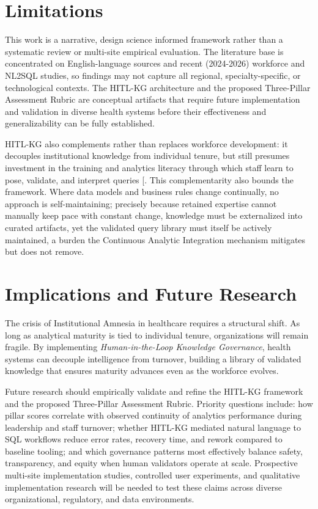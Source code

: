 \documentclass[
  american,
  11pt,
  letterpaper,
  oneside  ,captions=tableheading
]{scrartcl}
\begin{document}
\section{Limitations}\label{limitations}

This work is a narrative, design science informed framework rather than
a systematic review or multi-site empirical evaluation. The literature
base is concentrated on English-language sources and recent (2024-2026)
workforce and NL2SQL studies, so findings may not capture all regional,
specialty-specific, or technological contexts. The HITL-KG architecture
and the proposed Three-Pillar Assessment Rubric are conceptual artifacts
that require future implementation and validation in diverse health
systems before their effectiveness and generalizability can be fully
established.

HITL-KG also complements rather than replaces workforce development: it
decouples institutional knowledge from individual tenure, but still
presumes investment in the training and analytics literacy through which
staff learn to pose, validate, and interpret queries
{[}\citeproc{ref-ledikwe2013}{17}{]}. This complementarity also bounds
the framework. Where data models and business rules change continually,
no approach is self-maintaining; precisely because retained expertise
cannot manually keep pace with constant change, knowledge must be
externalized into curated artifacts, yet the validated query library
must itself be actively maintained, a burden the Continuous Analytic
Integration mechanism mitigates but does not remove.

\section{Implications and Future
Research}\label{implications-and-future-research}

The crisis of Institutional Amnesia in healthcare requires a structural
shift. As long as analytical maturity is tied to individual tenure,
organizations will remain fragile. By implementing
\emph{Human-in-the-Loop Knowledge Governance}, health systems can
decouple intelligence from turnover, building a library of validated
knowledge that ensures maturity advances even as the workforce evolves.

Future research should empirically validate and refine the HITL-KG
framework and the proposed Three-Pillar Assessment Rubric. Priority
questions include: how pillar scores correlate with observed continuity
of analytics performance during leadership and staff turnover; whether
HITL-KG mediated natural language to SQL workflows reduce error rates,
recovery time, and rework compared to baseline tooling; and which
governance patterns most effectively balance safety, transparency, and
equity when human validators operate at scale. Prospective multi-site
implementation studies, controlled user experiments, and qualitative
implementation research will be needed to test these claims across
diverse organizational, regulatory, and data environments.
\end{document}
